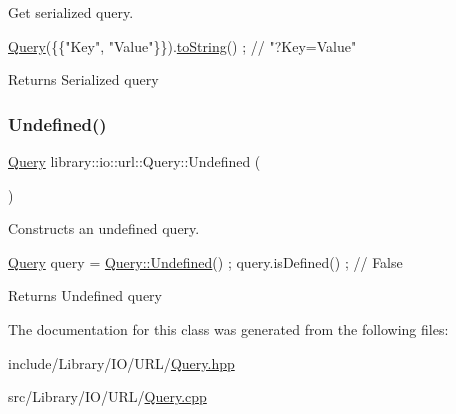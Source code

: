 Get serialized query. 


\begin{DoxyCode}
\hyperlink{classlibrary_1_1io_1_1url_1_1_query_a6781de8f7b7251f8e17c191434b08039}{Query}(\{\{\textcolor{stringliteral}{"Key"}, \textcolor{stringliteral}{"Value"}\}\}).\hyperlink{classlibrary_1_1io_1_1url_1_1_query_af38369d995520735ef60f28a949f1d6d}{toString}() ; \textcolor{comment}{// "?Key=Value"}
\end{DoxyCode}


\begin{DoxyReturn}{Returns}
Serialized query 
\end{DoxyReturn}
\mbox{\label{classlibrary_1_1io_1_1url_1_1_query_acea48a0bfba96773f6db11d1a904a520}} 
\subsubsection{\texorpdfstring{Undefined()}{Undefined()}}
{\footnotesize\ttfamily \hyperlink{classlibrary_1_1io_1_1url_1_1_query}{Query} library\+::io\+::url\+::\+Query\+::\+Undefined (\begin{DoxyParamCaption}{ }\end{DoxyParamCaption})\hspace{0.3cm}{\ttfamily [static]}}



Constructs an undefined query. 


\begin{DoxyCode}
\hyperlink{classlibrary_1_1io_1_1url_1_1_query_a6781de8f7b7251f8e17c191434b08039}{Query} query = \hyperlink{classlibrary_1_1io_1_1url_1_1_query_acea48a0bfba96773f6db11d1a904a520}{Query::Undefined}() ;
query.isDefined() ; \textcolor{comment}{// False}
\end{DoxyCode}


\begin{DoxyReturn}{Returns}
Undefined query 
\end{DoxyReturn}


The documentation for this class was generated from the following files\+:\begin{DoxyCompactItemize}
\item 
include/\+Library/\+I\+O/\+U\+R\+L/\hyperlink{_query_8hpp}{Query.\+hpp}\item 
src/\+Library/\+I\+O/\+U\+R\+L/\hyperlink{_query_8cpp}{Query.\+cpp}\end{DoxyCompactItemize}
